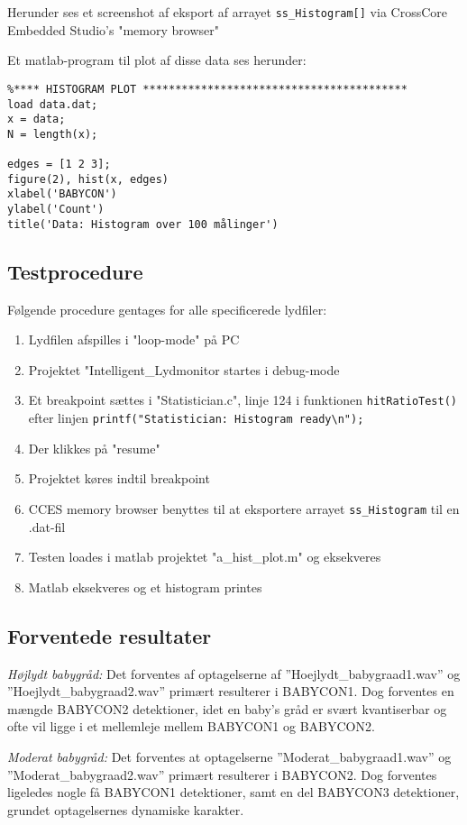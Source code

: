 Herunder ses et screenshot af eksport af arrayet \verb+ss_Histogram[]+ via CrossCore Embedded Studio's "memory browser" 

Et matlab-program til plot af disse data ses herunder:
\begin{verbatim}%**** HISTOGRAM PLOT *****************************************
load data.dat;
x = data;
N = length(x);

edges = [1 2 3];
figure(2), hist(x, edges)
xlabel('BABYCON')
ylabel('Count')
title('Data: Histogram over 100 målinger')
\end{verbatim}

\subsection{Testprocedure}
Følgende procedure gentages for alle specificerede lydfiler:
\begin{enumerate}
	\item Lydfilen afspilles i "loop-mode" på PC
	\item Projektet "Intelligent\_Lydmonitor startes i debug-mode
	\item Et breakpoint sættes i "Statistician.c", linje 124 i funktionen \verb+hitRatioTest()+ efter linjen \verb+printf("Statistician: Histogram ready\n");+ 
	\item Der klikkes på "resume"
	\item Projektet køres indtil breakpoint
	\item CCES memory browser benyttes til at eksportere arrayet \verb+ss_Histogram+ til en .dat-fil
	\item Testen loades i matlab projektet "a\_hist\_plot.m" og eksekveres
	\item Matlab eksekveres og et histogram printes 
\end{enumerate}

\subsection{Forventede resultater} 
\textit{Højlydt babygråd:} Det forventes af optagelserne af ''Hoejlydt\_babygraad1.wav'' og ''Hoejlydt\_babygraad2.wav'' primært resulterer i BABYCON1. Dog forventes en mængde BABYCON2 detektioner, idet en baby's gråd er svært kvantiserbar og ofte vil ligge i et mellemleje mellem BABYCON1 og BABYCON2. 

\textit{Moderat babygråd:} Det forventes at optagelserne ''Moderat\_babygraad1.wav'' og ''Moderat\_babygraad2.wav'' primært resulterer i BABYCON2. Dog forventes ligeledes nogle få BABYCON1 detektioner, samt en del BABYCON3 detektioner, grundet optagelsernes dynamiske karakter. 

